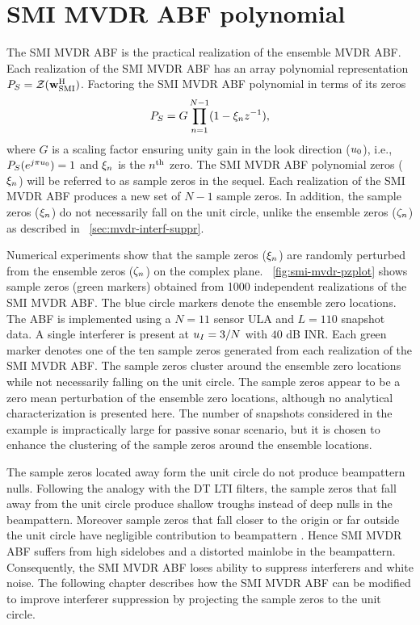 \section{SMI MVDR ABF polynomial}
\label{sec:smi-poly}
The SMI MVDR ABF is the practical realization of the ensemble MVDR
ABF. Each realization of the SMI MVDR ABF has an array polynomial
representation $P_S = \mathcal{Z}({\bf w}_{\rm SMI}^{\rm H})$. Factoring the SMI
MVDR ABF polynomial in terms of its zeros
\[
P_S = G\prod\limits_{n = 1}^{N-1}(1 - \xi_nz^{-1}),
\]
where $G$ is a scaling factor ensuring unity gain in the look
direction ($u_0$), i.e., $P_S(e^{j\pi u_0}) = 1$ and
$\xi_n$ is the $n^{\rm th}$ zero. The SMI MVDR ABF polynomial zeros
($\xi_n$) will be referred to as sample zeros in the sequel. Each
realization of the SMI MVDR ABF produces a new set of $N-1$ sample
zeros. In addition, the sample zeros ($\xi_n$) do not necessarily
fall on the unit circle, unlike the ensemble zeros ($\zeta_n$) as
described in \sect{}~\ref{sec:mvdr-interf-suppr}.

Numerical experiments show that the sample zeros ($\xi_n$) are
randomly perturbed from the ensemble zeros ($\zeta_n$) on the complex
plane. \figurename{}~\ref{fig:smi-mvdr-pzplot} shows sample zeros
(green markers) obtained from 1000 independent realizations of the SMI
MVDR ABF. The blue circle markers denote the ensemble zero
locations. The ABF is implemented using a $N = 11$ sensor ULA and
$L = 110$ snapshot data. A single interferer is present at
$u_I = 3/N$ with $40$ dB INR. Each green marker denotes one of the
ten sample zeros generated from each realization of the SMI MVDR
ABF. The sample zeros cluster around the ensemble zero locations while
not necessarily falling on the unit circle. The sample zeros appear to
be a zero mean perturbation of the ensemble zero locations, although
no analytical characterization is presented here. The number of
snapshots considered in the example is impractically large for passive
sonar scenario, but it is chosen to enhance the clustering of the
sample zeros around the ensemble locations.

The sample zeros located away form the unit circle do not produce
beampattern nulls. Following the analogy with the DT LTI filters, the
sample zeros that fall away from the unit circle produce shallow
troughs instead of deep nulls in the beampattern. Moreover sample
zeros that fall closer to the origin or far outside the unit circle
have negligible contribution to beampattern
\cite[Chap.~5]{Oppenheim1989}. Hence SMI MVDR ABF suffers from high
sidelobes and a distorted mainlobe in the beampattern. Consequently,
the SMI MVDR ABF loses ability to suppress interferers and white
noise. The following chapter describes how the SMI MVDR ABF can be
modified to improve interferer suppression by projecting the sample
zeros to the unit circle.


